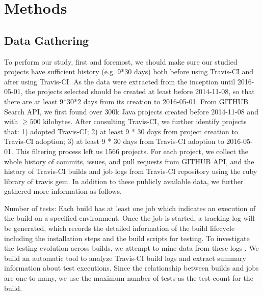 
\section{Methods}
\label{sec:method}

\subsection{Data Gathering}

To perform our study, first and foremost, we should make sure our studied projects have sufficient history (e.g. 9*30 days) both before using Travis-CI and after using Travis-CI.  As the data were extracted from the inception until 2016-05-01, the projects selected should be created at least before 2014-11-08, so that there are at least 9*30*2 days from its creation to 2016-05-01. 
From GITHUB Search API, we first found over 300k Java projects created before 2014-11-08 and with $\geqslant 500$ kilobytes. After consulting Travis-CI, we further identify projects that: 1) adopted Travis-CI; 2) at least 9 * 30 days from project creation to Travis-CI adoption; 3) at least 9 * 30 days from Travis-CI adoption to 2016-05-01. This filtering process left us 1566 projects.  
For each project, we collect the whole history of commits, issues, and pull requests from GITHUB API, and the history of Travis-CI builds and job logs from Travis-CI repository using the ruby library of travis gem.  In addition to these publicly available data, we further gathered more information as follows.

Number of tests: 
Each build has at least one job which indicates an execution of the build on a specified environment. Once the job is started, a tracking log will be generated, which records the detailed information of the build lifecycle including the installation steps and the build scripts for testing. To investigate the testing evolution across builds, we attempt to mine data from these logs . We build an automatic tool to analyze Travis-CI build logs and extract summary information about test executions. 
Since the relationship between builds and jobs are one-to-many, we use the maximum number of tests as the test count for the build. 

